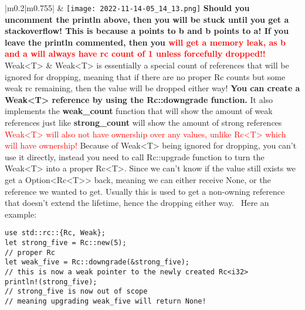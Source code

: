 \documentclass[main.tex,fontsize=8pt,paper=a4,paper=portrait,DIV=calc,]{scrartcl}
\begin{document}
\begin{table}[ht!]
\begin{tabular}{|m{0.2\linewidth}|m{0.755\linewidth}|}
\hline
&
\vspace{2mm}
\texttt{[image: 2022-11-14-05\_14\_13.png]}\newline 
\textbf{Should you uncomment the println above, then you will be stuck until you get a stackoverflow!\newline
This is because a points to b and b points to a!\newline
If you leave the println commented, then you \textcolor{red}{will get a memory leak, as b and a will always have rc count of 1 unless forcefully dropped!!}}
\\
\hline
Weak<T> & 
Weak<T> is essentially a special count of references that will be ignored for dropping, meaning that if there are no proper Rc counts but some weak rc remaining, then the value will be dropped either way!\newline
\textbf{You can create a Weak<T> reference by using the Rc::downgrade function.}\newline
\textcolor{OliveGreen}{It also implements the \textbf{weak\_count} function that will show the amount of weak references just like \textbf{strong\_count} will show the amount of strong references}\newline
\textcolor{red}{Weak<T> will also not have ownership over any values, unlike Rc<T> which will have ownership!}\newline
Because of Weak<T> being ignored for dropping, you can't use it directly, instead you need to call Rc::upgrade function to turn the Weak<T> into a proper Rc<T>.\newline
Since we can't know if the value still exists we get a Option<Rc<T>> back, meaning we can either receive None, or the reference we wanted to get.\newline
Usually this is used to get a non-owning reference that doesn't extend the lifetime, hence the dropping either way.\newline
\, \newline
Here an example:\newline
\begin{lstlisting}
use std::rc::{Rc, Weak};
let strong_five = Rc::new(5);
// proper Rc
let weak_five = Rc::downgrade(&strong_five);
// this is now a weak pointer to the newly created Rc<i32>
println!(strong_five);
// strong_five is now out of scope
// meaning upgrading weak_five will return None!
\end{lstlisting}

\end{tabular}
\end{table}
\end{document}
